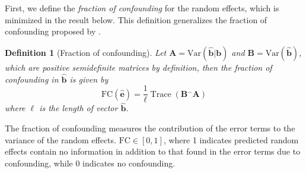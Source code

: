 \documentclass{article} %
\newtheorem{definition}{Definition}
\newcommand{\ginv}{\ensuremath{^{-}}}
\newcommand{\trans}{\ensuremath{^\prime}}
\newcommand{\var}{\ensuremath{\mathrm{Var}}}
\DeclareMathOperator{\tr}{Trace}
\begin{document}
First, we define the \emph{fraction of confounding} for the random effects, which is minimized in the result below. This definition generalizes the fraction of confounding proposed by \cite{HildenMinton:1995wh}. \\

%



\begin{definition}[Fraction of confounding]
Let $\bm{A} = \var(\widehat{\bm{b}} | \bm{b} )$ and $\bm{B} = \var(\widehat{\bm{b}})$, which are positive semidefinite matrices by definition, then the fraction of confounding in $\widehat{\bm{b}}$ is given by
%
\begin{equation}\label{eq:fc2}
\text{FC}(\widehat{\bm{e}}) = \frac{1}{\ell} \tr\left( \bm{B}\ginv\bm{A} \right)
\end{equation}
where $\ell$ is the length of vector $\widehat{\bm{b}}$.
\end{definition}
The fraction of confounding measures the contribution of the error terms  to the variance of the random effects. $\text{FC} \in [0,1]$, where 1 indicates predicted random effects contain no information in addition to that found in the error terms due to confounding, while 0 indicates no confounding. 
\end{document}
